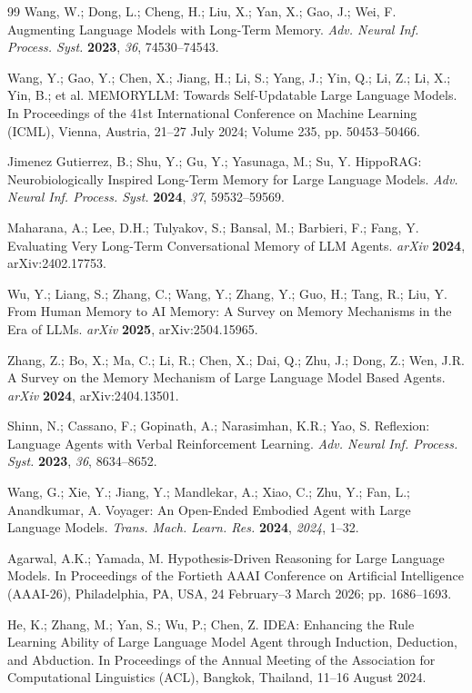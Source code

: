 \documentclass[10pt,a4paper,onecolumn]{article}
\theoremstyle{definition}
\theoremstyle{remark}
\begin{document}
\begin{thebibliography}{99}
Wang, W.; Dong, L.; Cheng, H.; Liu, X.; Yan, X.; Gao, J.; Wei, F. Augmenting Language Models with Long-Term Memory. \emph{Adv. Neural Inf. Process. Syst.} \textbf{2023}, \emph{36}, 74530--74543.

Wang, Y.; Gao, Y.; Chen, X.; Jiang, H.; Li, S.; Yang, J.; Yin, Q.; Li, Z.; Li, X.; Yin, B.; et al. MEMORYLLM: Towards Self-Updatable Large Language Models. In Proceedings of the 41st International Conference on Machine Learning (ICML), Vienna, Austria, 21--27 July 2024; Volume 235, pp. 50453--50466.

Jimenez Gutierrez, B.; Shu, Y.; Gu, Y.; Yasunaga, M.; Su, Y. HippoRAG: Neurobiologically Inspired Long-Term Memory for Large Language Models. \emph{Adv. Neural Inf. Process. Syst.} \textbf{2024}, \emph{37}, 59532--59569.

Maharana, A.; Lee, D.H.; Tulyakov, S.; Bansal, M.; Barbieri, F.; Fang, Y. Evaluating Very Long-Term Conversational Memory of LLM Agents. \emph{arXiv} \textbf{2024}, arXiv:2402.17753.

Wu, Y.; Liang, S.; Zhang, C.; Wang, Y.; Zhang, Y.; Guo, H.; Tang, R.; Liu, Y. From Human Memory to AI Memory: A Survey on Memory Mechanisms in the Era of LLMs. \emph{arXiv} \textbf{2025}, arXiv:2504.15965.

Zhang, Z.; Bo, X.; Ma, C.; Li, R.; Chen, X.; Dai, Q.; Zhu, J.; Dong, Z.; Wen, J.R. A Survey on the Memory Mechanism of Large Language Model Based Agents. \emph{arXiv} \textbf{2024}, arXiv:2404.13501.

Shinn, N.; Cassano, F.; Gopinath, A.; Narasimhan, K.R.; Yao, S. Reflexion: Language Agents with Verbal Reinforcement Learning. \emph{Adv. Neural Inf. Process. Syst.} \textbf{2023}, \emph{36}, 8634--8652.

Wang, G.; Xie, Y.; Jiang, Y.; Mandlekar, A.; Xiao, C.; Zhu, Y.; Fan, L.; Anandkumar, A. Voyager: An Open-Ended Embodied Agent with Large Language Models. \emph{Trans. Mach. Learn. Res.} \textbf{2024}, \emph{2024}, 1--32.

Agarwal, A.K.; Yamada, M. Hypothesis-Driven Reasoning for Large Language Models. In Proceedings of the Fortieth AAAI Conference on Artificial Intelligence (AAAI-26), Philadelphia, PA, USA, 24 February--3 March 2026; pp. 1686--1693.

He, K.; Zhang, M.; Yan, S.; Wu, P.; Chen, Z. IDEA: Enhancing the Rule Learning Ability of Large Language Model Agent through Induction, Deduction, and Abduction. In Proceedings of the Annual Meeting of the Association for Computational Linguistics (ACL), Bangkok, Thailand, 11--16 August 2024.


\end{thebibliography}
\end{document}
